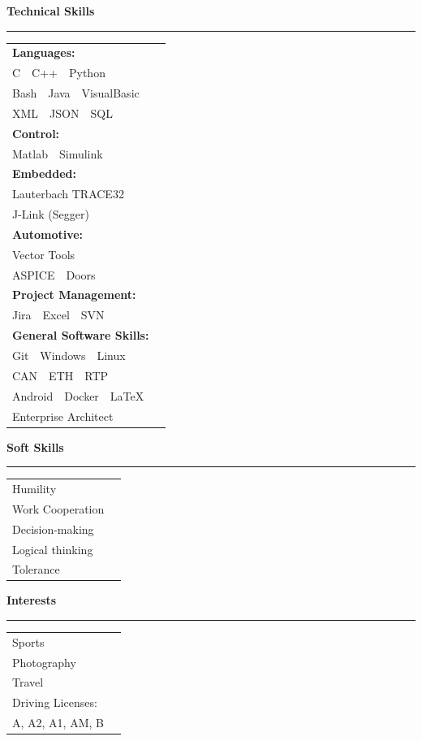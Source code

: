 \documentclass[11pt,a4paper]{article}
\newcommand{\cvsection}[1]{
    \vspace{0.5em}
    \noindent\textbf{\large #1}
    \vspace{0.5em}
    \hrule\vspace{0.5em}
}
\newcommand{\skillsep}{\ {\color{gray}\textbar}\ }
\begin{document}
\begin{minipage}{0.25\textwidth}
    \cvsection{Technical Skills}
        \begin{tabular}{@{}ll@{}}
        \textbf{Languages:}\\
          C\skillsep C++\skillsep Python\skillsep \\
          Bash\skillsep Java\skillsep VisualBasic\\
          XML\skillsep JSON\skillsep SQL\\
        \textbf{Control:}\\
          Matlab\skillsep Simulink \\
        \textbf{Embedded:}\\
            Lauterbach TRACE32\\ 
            J-Link (Segger)\\
        \textbf{Automotive:}\\
          Vector Tools\\
          ASPICE\skillsep Doors\\
        \textbf{Project Management:}\\
        Jira\skillsep Excel\skillsep SVN \\
        \textbf{General Software Skills:} \\
          Git\skillsep Windows\skillsep Linux\\
          CAN\skillsep ETH\skillsep RTP \\
          Android\skillsep Docker\skillsep LaTeX \\
          Enterprise Architect
          \end{tabular}
    
    
    \cvsection{Soft Skills}
    \begin{tabular}{@{}ll@{}}
        Humility            \\
        Work Cooperation    \\
        Decision-making     \\
        Logical thinking    \\
        Tolerance
    \end{tabular}
    
    \cvsection{Interests}
    \begin{tabular}{@{}ll@{}}
        Sports       \\
        Photography  \\
        Travel\\
        Driving Licenses: \\
        A, A2, A1, AM, B \\
    \end{tabular}
\end{minipage}
\end{document}
